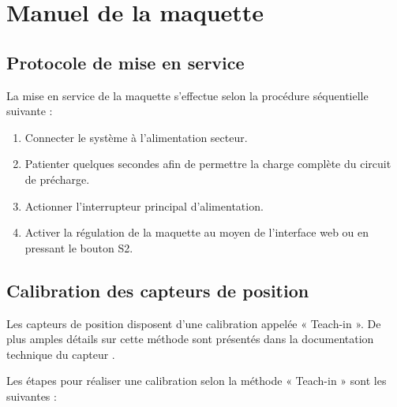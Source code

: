 \chapter{Manuel de la maquette}
\label{annexe:Manuel}

\section{Protocole de mise en service}
\label{sec:Protocole}
La mise en service de la maquette s'effectue selon la procédure séquentielle suivante :
\begin{enumerate}
  \item Connecter le système à l'alimentation secteur.

  \item Patienter quelques secondes afin de permettre la charge complète du circuit de précharge.

  \item Actionner l'interrupteur principal d'alimentation.

  \item Activer la régulation de la maquette au moyen de l'interface web ou en pressant le bouton S2.
\end{enumerate}

\section{Calibration des capteurs de position}
\label{sec:CalibrationCaptPosManuel}
Les capteurs de position disposent d’une calibration appelée « Teach-in ». De plus amples détails sur cette méthode sont présentés dans la documentation technique du capteur \cite{CaptPosition}.

Les étapes pour réaliser une calibration selon la méthode « Teach-in » sont les suivantes :

